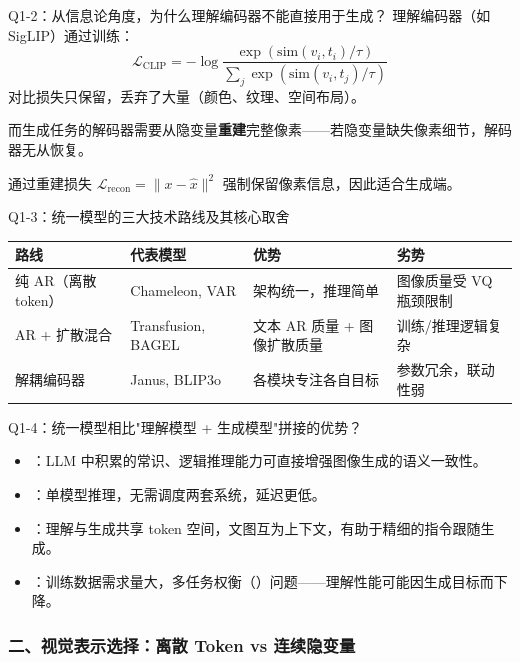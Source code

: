 \begin{conceptbox}{Q1-2：从信息论角度，为什么理解编码器不能直接用于生成？}
理解编码器（如 SigLIP）通过训练：
\[
\mathcal{L}_{\text{CLIP}} = -\log \frac{\exp(\text{sim}(v_i, t_i)/\tau)}{\sum_j \exp(\text{sim}(v_i, t_j)/\tau)}
\]
对比损失只保留，丢弃了大量（颜色、纹理、空间布局）。

而生成任务的解码器需要从隐变量\textbf{重建}完整像素——若隐变量缺失像素细节，解码器无从恢复。

 通过重建损失 $\mathcal{L}_{\text{recon}} = \|x - \hat{x}\|^2$ 强制保留像素信息，因此适合生成端。
\end{conceptbox}

\begin{conceptbox}{Q1-3：统一模型的三大技术路线及其核心取舍}
\begin{center}
\small
\begin{tabular}{|l|l|l|l|}
\hline
\textbf{路线} & \textbf{代表模型} & \textbf{优势} & \textbf{劣势} \\
\hline
纯 AR（离散 token） & Chameleon, VAR & 架构统一，推理简单 & 图像质量受 VQ 瓶颈限制 \\
AR + 扩散混合 & Transfusion, BAGEL & 文本 AR 质量 + 图像扩散质量 & 训练/推理逻辑复杂 \\
解耦编码器 & Janus, BLIP3o & 各模块专注各自目标 & 参数冗余，联动性弱 \\
\hline
\end{tabular}
\end{center}
\end{conceptbox}

\begin{conceptbox}{Q1-4：统一模型相比"理解模型 + 生成模型"拼接的优势？}
\begin{itemize}
  \item {}：LLM 中积累的常识、逻辑推理能力可直接增强图像生成的语义一致性。
  \item {}：单模型推理，无需调度两套系统，延迟更低。
  \item {}：理解与生成共享 token 空间，文图互为上下文，有助于精细的指令跟随生成。
  \item {}：训练数据需求量大，多任务权衡（）问题——理解性能可能因生成目标而下降。
\end{itemize}
\end{conceptbox}

\subsubsection{二、视觉表示选择：离散 Token vs 连续隐变量}

